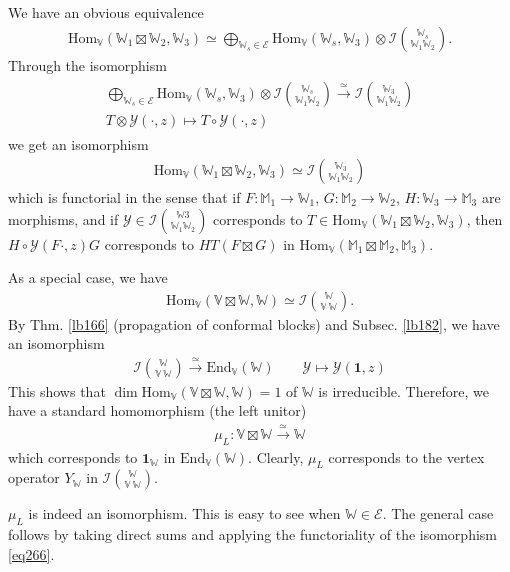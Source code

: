 \documentclass[11pt,b5paper,notitlepage]{article}
\theoremstyle{definition}
\theoremstyle{plain}
\newcommand{\mc}{\mathcal}
\newcommand{\End}{\mathrm{End}} %
\newcommand{\id}{\mathbf{1}}
\newcommand{\Hom}{\mathrm{Hom}}
\newcommand{\Vbb}{\mathbb V}
\newcommand{\Wbb}{\mathbb W}
\newcommand{\Mbb}{\mathbb M}
\numberwithin{equation}{section}
\begin{document}
We have an obvious equivalence
\begin{align*}
\Hom_\Vbb(\Wbb_1\boxtimes\Wbb_2,\Wbb_3)\simeq \bigoplus_{\Wbb_s\in\mc E}\Hom_\Vbb(\Wbb_s,\Wbb_3)\otimes \mc I{\Wbb_s\choose \Wbb_1\Wbb_2}.
\end{align*}
Through the isomorphism
\begin{gather}
\begin{gathered}
\bigoplus_{\Wbb_s\in\mc E}\Hom_\Vbb(\Wbb_s,\Wbb_3)\otimes \mc I{\Wbb_s\choose \Wbb_1\Wbb_2}\xrightarrow{\simeq} \mc I{\Wbb_3\choose \Wbb_1\Wbb_2}\\
T\otimes\mc Y(\cdot,z)\mapsto T\circ\mc Y(\cdot,z) 
\end{gathered}
\end{gather}
we get an isomorphism
\begin{align}
\Hom_\Vbb(\Wbb_1\boxtimes\Wbb_2,\Wbb_3)\simeq\mc I{\Wbb_3\choose \Wbb_1\Wbb_2}\label{eq266}
\end{align}
which is functorial in the sense that if $F:\Mbb_1\rightarrow\Wbb_1$, $G:\Mbb_2\rightarrow\Wbb_2$, $H:\Wbb_3\rightarrow\Mbb_3$ are morphisms, and if $\mc Y\in\mc I{\Wbb3\choose \Wbb_1\Wbb_2}$ corresponds to $T\in\Hom_\Vbb(\Wbb_1\boxtimes\Wbb_2,\Wbb_3)$, then $H\circ\mc Y(F\cdot,z)G$ corresponds to $HT(F\boxtimes G)$ in $\Hom_\Vbb(\Mbb_1\boxtimes\Mbb_2,\Mbb_3)$.

As a special case, we have
\begin{align}
\Hom_\Vbb(\Vbb\boxtimes\Wbb,\Wbb)\simeq\mc I{\Wbb\choose\Vbb~\Wbb}.
\end{align}
By Thm. \ref{lb166} (propagation of conformal blocks) and Subsec. \ref{lb182}, we have an isomorphism
\begin{gather*}
\mc I{\Wbb\choose\Vbb~\Wbb}\xrightarrow{\simeq}\End_\Vbb(\Wbb)\qquad\mc Y\mapsto \mc Y(\id,z)
\end{gather*}
This shows that $\dim\Hom_\Vbb(\Vbb\boxtimes\Wbb,\Wbb)=1$ of $\Wbb$ is irreducible. Therefore, we have a standard homomorphism (the left unitor)
\begin{align}
\mu_L:\Vbb\boxtimes\Wbb\xrightarrow{\simeq}\Wbb
\end{align}
which corresponds to $\id_\Wbb$ in $\End_\Vbb(\Wbb)$. Clearly, $\mu_L$ corresponds to the vertex operator $Y_\Wbb$ in $\mc I{\Wbb\choose\Vbb~\Wbb}$.

$\mu_L$ is indeed an isomorphism. This is easy to see when $\Wbb\in\mc E$. The general case follows by taking direct sums and applying the functoriality of the isomorphism \eqref{eq266}.
\end{document}
